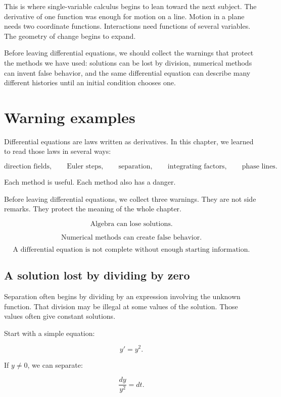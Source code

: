 This is where single-variable calculus begins to lean toward the next subject.  The
derivative of one function was enough for motion on a line.  Motion in a plane needs two
coordinate functions.  Interactions need functions of several variables.  The geometry of
change begins to expand.

Before leaving differential equations, we should collect the warnings that protect the
methods we have used: solutions can be lost by division, numerical methods can invent
false behavior, and the same differential equation can describe many different histories
until an initial condition chooses one.
\section{Warning examples}
\label{sec:de-warning-examples}

Differential equations are laws written as derivatives.  In this chapter, we learned to
read those laws in several ways:

\[
\text{direction fields},
\qquad
\text{Euler steps},
\qquad
\text{separation},
\qquad
\text{integrating factors},
\qquad
\text{phase lines}.
\]

Each method is useful.  Each method also has a danger.

Before leaving differential equations, we collect three warnings.  They are not side
remarks.  They protect the meaning of the whole chapter.

\[
\boxed{
\text{Algebra can lose solutions.}
}
\]

\[
\boxed{
\text{Numerical methods can create false behavior.}
}
\]

\[
\boxed{
\text{A differential equation is not complete without enough starting information.}
}
\]

\subsection{A solution lost by dividing by zero}
\label{subsec:solution-lost-by-dividing-zero}

Separation often begins by dividing by an expression involving the unknown function.
That division may be illegal at some values of the solution.  Those values often give
constant solutions.

Start with a simple equation:

\[
y'=y^2.
\]

If \(y\neq0\), we can separate:

\[
\frac{dy}{y^2}=dt.
\]

